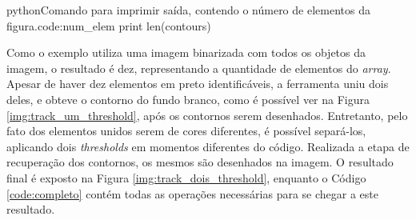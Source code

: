 \begin{code}{python}{Comando para imprimir saída, contendo o número de elementos da figura.}{code:num_elem}
print len(contours)
\end{code}

Como o exemplo utiliza uma imagem binarizada com todos os objetos da imagem, o resultado é dez, representando a quantidade de elementos do \textit{array}. Apesar de haver dez elementos em preto identificáveis, a ferramenta uniu dois deles, e obteve o contorno do fundo branco, como é possível ver na Figura \ref{img:track_um_threshold}, após os contornos serem desenhados. Entretanto, pelo fato dos elementos unidos serem de cores diferentes, é possível separá-los, aplicando dois \textit{thresholds} em momentos diferentes do código. Realizada a etapa de recuperação dos contornos, os mesmos são desenhados na imagem. O resultado final é exposto na Figura \ref{img:track_dois_threshold}, enquanto o Código \ref{code:completo} contém todas as operações necessárias para se chegar a este resultado.

